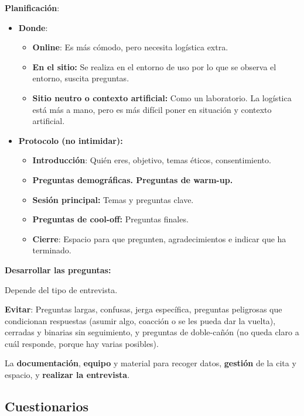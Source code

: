 \documentclass[12pt, twoside, openright]{report} %
\begin{document}
\textbf{Planificación}:

\begin{itemize}
	\item \textbf{Donde}:

	      \begin{itemize}
		      \item \textbf{Online}: Es más cómodo, pero necesita logística extra.
		      \item \textbf{En el sitio:} Se realiza en el entorno de uso por lo que
		            se observa el entorno, suscita preguntas.
		      \item \textbf{Sitio neutro o contexto artificial:} Como un laboratorio.
		            La logística está más a mano, pero es más difícil poner en
		            situación y contexto artificial.
	      \end{itemize}
	\item \textbf{Protocolo (no intimidar):}

	      \begin{itemize}
		      \item \textbf{Introducción}: Quién eres, objetivo, temas éticos,
		            consentimiento.
		      \item \textbf{Preguntas demográficas. Preguntas de warm-up.}
		      \item \textbf{Sesión principal:} Temas y preguntas clave.
		      \item \textbf{Preguntas de cool-off:} Preguntas finales.
		      \item \textbf{Cierre}: Espacio para que pregunten, agradecimientos e indicar que ha terminado.
	      \end{itemize}
\end{itemize}

\textbf{Desarrollar las preguntas:}

Depende del tipo de entrevista.

\textbf{Evitar}: Preguntas largas, confusas, jerga específica, preguntas
peligrosas que condicionan respuestas (asumir algo, coacción o se les
pueda dar la vuelta), cerradas y binarias sin seguimiento, y preguntas
de doble-cañón (no queda claro a cuál responde, porque hay varias
posibles).

La \textbf{documentación}, \textbf{equipo} y material para recoger
datos, \textbf{gestión} de la cita y espacio, y \textbf{realizar la
	entrevista}.

\subsection{Cuestionarios}
\end{document}
